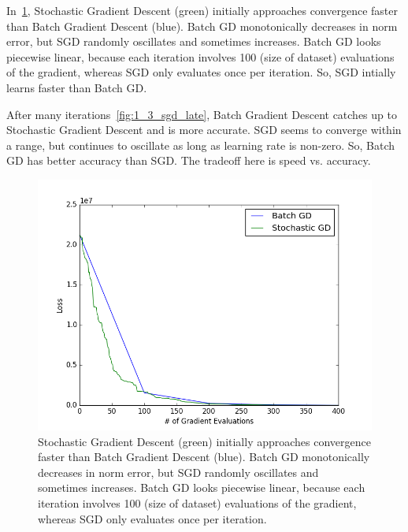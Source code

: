 In~\cref{fig:1_3_sgd_early}, Stochastic Gradient Descent (green) initially approaches convergence faster than Batch Gradient Descent (blue).
Batch GD monotonically decreases in norm error, but SGD randomly oscillates and sometimes increases.
Batch GD looks piecewise linear, because each iteration involves 100 (size of dataset) evaluations of the gradient, whereas SGD only evaluates once per iteration.
So, SGD intially learns faster than Batch GD.

After many iterations~\cref{fig:1_3_sgd_late}, Batch Gradient Descent catches up to Stochastic Gradient Descent and is more accurate.
SGD seems to converge within a range, but continues to oscillate as long as learning rate is non-zero.
So, Batch GD has better accuracy than SGD.
The tradeoff here is speed vs. accuracy.


\begin{figure}
	\centering
	\includegraphics [trim=0 0 0 0, clip, angle=0, width=0.8\columnwidth,
	keepaspectratio]{figures/1_3_sgd_early}
	\caption{Stochastic Gradient Descent (green) initially approaches convergence faster than Batch Gradient Descent (blue). Batch GD monotonically decreases in norm error, but SGD randomly oscillates and sometimes increases. Batch GD looks piecewise linear, because each iteration involves 100 (size of dataset) evaluations of the gradient, whereas SGD only evaluates once per iteration.} 
	\label{fig:1_3_sgd_early} 
\end{figure}

